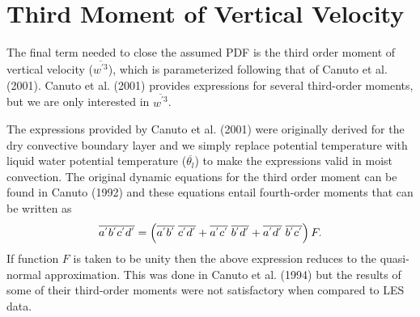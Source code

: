 \documentclass[12pt,titlepage]{article}
\numberwithin{equation}{section}
\begin{document}
\section{Third Moment of Vertical Velocity}
\label{diag_third}

The final term needed to close the assumed PDF is the third order moment of vertical velocity ($\overline{w^{'3}}$), which is parameterized following that of Canuto et al. (2001).  Canuto et al. (2001) provides expressions for several third-order moments, but we are only interested in $\overline{w^{'3}}$.  

The expressions provided by Canuto et al. (2001) were originally derived for the dry convective boundary layer and we simply replace potential temperature with liquid water potential temperature ($\overline{\theta_{l}}$) to make the expressions valid in moist convection. The original dynamic equations for the third order moment can be found in Canuto (1992) and these equations entail fourth-order moments that can be written as
%
\begin{equation}
  \overline{a^{'}b^{'}c^{'}d^{'}}=\left(\overline{a^{'}b^{'}}\hspace{0.1cm}\overline{c^{'}d^{'}}+\overline{a^{'}c^{'}}\hspace{0.1cm}\overline{b^{'}d^{'}}+\overline{a^{'}d^{'}}\hspace{0.1cm}\overline{b^{'}c^{'}}\right)F . 
  \label{fourth}
\end{equation}
%
If function $F$ is taken to be unity then the above expression reduces to the quasi-normal approximation.  This was done in Canuto et al. (1994) but the results of some of their third-order moments were not satisfactory when compared to LES data.   
\end{document}
